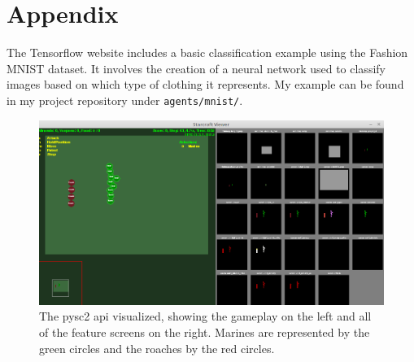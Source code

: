 \documentclass{amsart}
\theoremstyle{definition}
\begin{document}






\section{Appendix}


The Tensorflow website includes a basic classification example using the Fashion MNIST dataset.
It involves the creation of a neural network used to classify images based on which type of clothing it represents.
My example can be found in my project repository under {\tt agents/mnist/}.


\begin{figure}[h!]
    \includegraphics[width=1.0\linewidth]{gameplay}
    \caption{The pysc2 api visualized, showing the gameplay on the left and all of the feature screens on the right. Marines are represented by the green circles and the roaches by the red circles.}
\end{figure}
\end{document}
